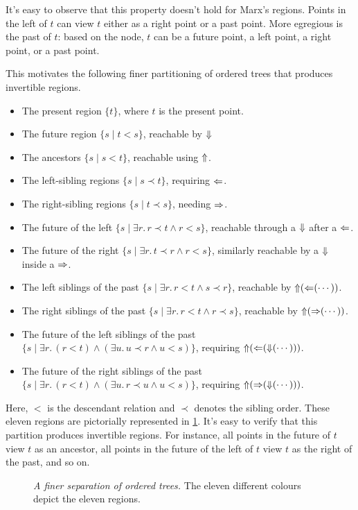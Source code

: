 \documentclass[a4paper,UKenglish,cleveref, autoref, thm-restate, numberwithinsect]{lipics-v2021}
\def\Larrow{\ensuremath\mathord{\Leftarrow}}
\def\Rarrow{\ensuremath\mathord{\Rightarrow}}
\def\Uarrow{\ensuremath\mathord{\Uparrow}}
\def\Darrow{\ensuremath\mathord{\Downarrow}}
\begin{document}
It's easy to observe that this property doesn't hold for Marx's regions. Points in the left of $t$ can view $t$ either as a right point or a past point.  More egregious is the past of $t$: based on the node, $t$ can be a future point, a left point, a right point, or a past point.

This motivates the following finer partitioning of ordered trees that produces invertible regions.
\begin{itemize}
    \item The present region $\{t\}$, where $t$ is the present point.
    \item The future region $\{s \mid t < s\}$, reachable by $\Darrow$
    \item The ancestors $\{s \mid s < t\}$, reachable using $\Uarrow$.
    \item The left-sibling regions $\{s \mid s \prec t\}$, requiring $\Larrow$.
    \item The right-sibling regions $\{s \mid t \prec s\}$, needing $\Rarrow$.
    \item The future of the left $\{s \mid \exists r.\, r \prec t \land r < s\}$, reachable through a $\Darrow$ after a $\Larrow$.
    \item The future of the right $\{s \mid \exists r.\, t \prec r \land r < s\}$, similarly reachable by a $\Darrow$ inside a $\Rarrow$.
    \item The left siblings of the past $\{s \mid \exists r.\, r < t \land s \prec r\}$, reachable by $\Uarrow(\Larrow(\cdots))$.
    \item The right siblings of the past $\{s \mid \exists r.\, r < t \land r \prec s\}$, reachable by $\Uarrow(\Rarrow(\cdots))$.
    \item The future of the left siblings of the past $\{s \mid \exists r.\, (r < t) \land (\exists u.\, u \prec r \land u < s)\}$, requiring $\Uarrow(\Larrow(\Darrow(\cdots)))$.
    \item The future of the right siblings of the past $\{s \mid \exists r.\, (r < t) \land (\exists u.\, r \prec u \land u < s)\}$, requiring $\Uarrow(\Rarrow(\Darrow(\cdots)))$.
\end{itemize}
Here, $<$ is the descendant relation and $\prec$ denotes the sibling order. These eleven regions are pictorially represented in \cref{finerSeparationFig}. It's easy to verify that this partition produces invertible regions. For instance, all points in the future of $t$ view $t$ as an ancestor, all points in the future of the left of $t$ view $t$ as the right of the past, and so on.
\begin{figure}[h]
    \centering
    \caption{\emph{A finer separation of ordered trees.} The eleven different colours depict the eleven regions.}
    \label{finerSeparationFig}
\end{figure}
\end{document}
